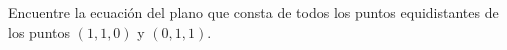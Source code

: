 \item Encuentre la ecuación del plano que consta de todos los puntos equidistantes de los puntos $(1, 1, 0)$ y $(0, 1, 1)$.
